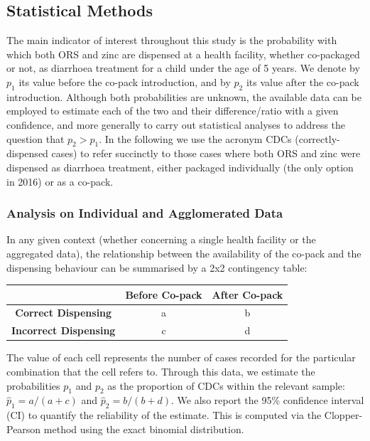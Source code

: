 \documentclass[a4paper, 12pt]{article}
\begin{document}
\subsection{Statistical Methods}

The main indicator of interest throughout this study is the probability with which both ORS and zinc are dispensed at a health facility, whether co-packaged or not, as diarrhoea treatment for a child under the age of 5 years. We denote by $p_1$ its value before the co-pack introduction, and by $p_2$ its value after the co-pack introduction. Although both probabilities are unknown, the available data can be employed to estimate each of the two and their difference/ratio with a given confidence, and more generally to carry out statistical analyses to address the question that $p_2 > p_1$.
In the following we use the acronym CDCs (correctly-dispensed cases) to refer succinctly to those cases where both ORS and zinc were dispensed as diarrhoea treatment, either packaged individually (the only option in 2016) or as a co-pack.

\subsubsection{Analysis on Individual and Agglomerated Data}

In any given context (whether concerning a single health facility or the aggregated data), the relationship between the availability of the co-pack and the dispensing behaviour can be summarised by a 2x2 contingency table:
 
 \begin{center}
 \begin{tabular}{c|cc}
 & \bf Before Co-pack & \bf After Co-pack \\ \hline
 \bf Correct Dispensing & a & b \\
 \bf Incorrect Dispensing  & c & d  
\end{tabular}
\end{center}

The value of each cell represents the number of cases recorded for the particular combination that the cell refers to. Through this data, we estimate the probabilities $p_1$ and $p_2$ as the proportion of CDCs within the relevant sample: 
$\hat p_1 = a/(a+c)$ and $\hat p_2 = b/(b+d)$. 
We also report the 95\% confidence interval (CI) to quantify the reliability of the estimate.
This is computed via the Clopper-Pearson method using the exact binomial distribution\cite{clopper1934}.
\end{document}
